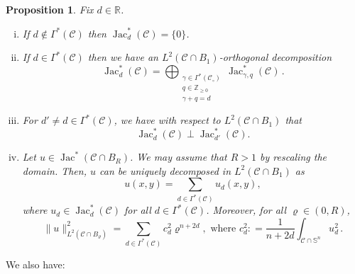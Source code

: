 \documentclass[11pt, letterpaper, reqno]{amsart}
\numberwithin{equation}{section}
\newtheorem{Prop}[Def]{Proposition}
\theoremstyle{remark}
\newcommand{\RR}{\mathbb{R}}
\newcommand{\SSp}{\mathbb{S}}
\newcommand{\ZZ}{\mathbb{Z}}
\newcommand{\cC}{\mathcal{C}}
\newcommand{\Jac}{\operatorname{Jac}}
\begin{document}
\begin{Prop} \label{Prop_Jac field_Decomp}
    Fix $d \in \RR$.
    \begin{enumerate}[(i)]
    \item If $d \not \in \Gamma^*(\cC)$ then $\Jac^*_d(\cC) = \{0\}$. 
    \item If $d \in \Gamma^*(\cC)$ then we have an $L^2(\cC \cap B_1)$-orthogonal decomposition
    \[
          \Jac_d^*(\cC) = \bigoplus_{\substack{\gamma\in \Gamma^*(\cC_\circ)\\ q\in \ZZ_{\geq 0}\\ \gamma+q = d}} \Jac^*_{\gamma, q}(\cC)\,.     \]   
       \item For $d'\neq d \in \Gamma^*(\cC)$, we have with respect to $L^2(\cC \cap B_1)$ that 
       \[ \Jac^*_d(\cC) \perp \Jac_{d'}^*(\cC). \]
     \item Let $u\in \Jac^*(\cC \cap B_R)$. We may assume that $R > 1$ by rescaling the domain. Then, $u$ can be uniquely decomposed in $L^2(\cC \cap B_1)$ as
       \begin{equation}\label{Equ_Jac field_L^2 decomp of u}
         u(x, y) = \sum_{d \in \Gamma^*(\cC)} u_d(x, y),
       \end{equation}
       where $u_d \in \Jac^*_d(\cC)$ for all $d \in \Gamma^*(\cC)$. Moreover, for all $\varrho \in (0, R)$, 
       \[
       \| u \|_{L^2(\cC \cap B_\varrho)}^2 = \sum_{d \in\Gamma^*(\cC)} c_d^2 \varrho^{n+2d}, \text{ where } c_d^2 : = \frac{1}{n+2d} \int_{\cC \cap \SSp^n} u_d^2 \, .
       \]
    \end{enumerate}
 \end{Prop}
 
We also have:
\end{document}
